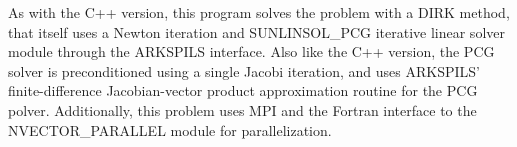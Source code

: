 \documentclass[letterpaper,10pt,english]{sphinxmanual}
\begin{document}
As with the C++ version, this program solves the problem with a DIRK
method, that itself uses a Newton iteration and SUNLINSOL\_PCG
iterative linear solver module through the ARKSPILS interface.  Also
like the C++ version, the PCG solver is preconditioned using a single
Jacobi iteration, and uses ARKSPILS' finite-difference Jacobian-vector
product approximation routine for the PCG polver.  Additionally, this
problem uses MPI and the Fortran interface to the NVECTOR\_PARALLEL
module for parallelization.
\label{References:references}
\begin{thebibliography}{HSR2017}
\end{thebibliography}



\renewcommand{\indexname}{Index}
\printindex
\end{document}
